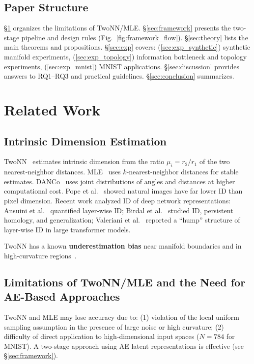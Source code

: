 \documentclass[12pt,a4paper]{article}
\begin{document}
\subsection{Paper Structure}\label{sec:intro_structure}

\S\ref{sec:related} organizes the limitations of TwoNN/MLE.
\S\ref{sec:framework} presents the two-stage pipeline and design rules (Fig.~\ref{fig:framework_flow}).
\S\ref{sec:theory} lists the main theorems and propositions.
\S\ref{sec:exp} covers: (\ref{sec:exp_synthetic}) synthetic manifold experiments, (\ref{sec:exp_topology}) information bottleneck and topology experiments, (\ref{sec:exp_mnist}) MNIST applications.
\S\ref{sec:discussion} provides answers to RQ1--RQ3 and practical guidelines.
\S\ref{sec:conclusion} summarizes.

\section{Related Work}\label{sec:related}

\subsection{Intrinsic Dimension Estimation}

TwoNN~\cite{facco2017twonn} estimates intrinsic dimension from the ratio $\mu_i = r_2/r_1$ of the two nearest-neighbor distances.
MLE~\cite{levina2005mle} uses $k$-nearest-neighbor distances for stable estimates.
DANCo~\cite{ceruti2014danco} uses joint distributions of angles and distances at higher computational cost.
Pope et al.~\cite{pope2021intrinsic} showed natural images have far lower ID than pixel dimension.
Recent work analyzed ID of deep network representations: Ansuini et al.~\cite{ansuini2019intrinsic} quantified layer-wise ID; Birdal et al.~\cite{birdal2021intrinsic} studied ID, persistent homology, and generalization; Valeriani et al.~\cite{valeriani2023geometry} reported a ``hump'' structure of layer-wise ID in large transformer models.

TwoNN has a known \textbf{underestimation bias} near manifold boundaries and in high-curvature regions~\cite{facco2017twonn}.

\subsection{Limitations of TwoNN/MLE and the Need for AE-Based Approaches}\label{sec:related_topology}

TwoNN and MLE may lose accuracy due to: (1) violation of the local uniform sampling assumption in the presence of large noise or high curvature; (2) difficulty of direct application to high-dimensional input spaces ($N=784$ for MNIST). A two-stage approach using AE latent representations is effective (see \S\ref{sec:framework}).
\end{document}
